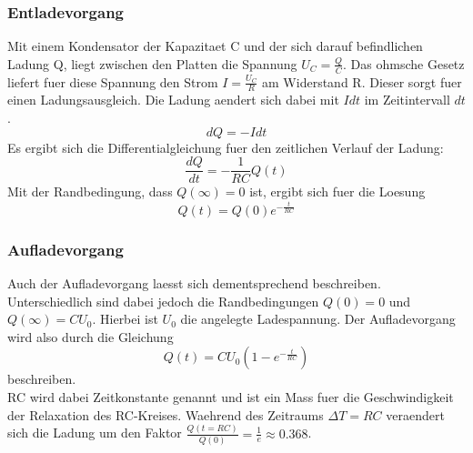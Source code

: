 \subsubsection{Entladevorgang}
Mit einem Kondensator der Kapazitaet C und der sich darauf befindlichen Ladung Q, liegt zwischen den Platten die Spannung $U_C=\frac{Q}{C}$. Das ohmsche Gesetz liefert fuer diese Spannung den Strom $I=\frac{U_C}{R}$ am Widerstand R. Dieser sorgt fuer einen Ladungsausgleich. Die Ladung aendert sich dabei mit $Idt$ im Zeitintervall $dt$. 
\begin{equation}
    dQ=-Idt
\end{equation}
Es ergibt sich die Differentialgleichung fuer den zeitlichen Verlauf der Ladung:
\begin{equation}
    \frac{dQ}{dt}=-\frac{1}{RC}Q(t)
\end{equation}
Mit der Randbedingung, dass $Q(\infty)=0$ ist, ergibt sich fuer die Loesung 
\begin{equation}
    Q(t)=Q(0)e^{-\frac{t}{RC}}
\end{equation}
\subsubsection{Aufladevorgang}
Auch der Aufladevorgang laesst sich dementsprechend beschreiben. Unterschiedlich sind dabei jedoch die Randbedingungen $Q(0)=0$ und $Q(\infty)=CU_0$. Hierbei ist $U_0$ die angelegte Ladespannung. 
Der Aufladevorgang wird also durch die Gleichung 
\begin{equation}
    Q(t)=CU_0(1-e^{-\frac{t}{RC}})
\end{equation}
beschreiben.\\
RC wird dabei Zeitkonstante genannt und ist ein Mass fuer die Geschwindigkeit der Relaxation des RC-Kreises. Waehrend des Zeitraums $\Delta T=RC$ veraendert sich die Ladung um den Faktor $\frac{Q(t=RC)}{Q(0)}=\frac{1}{e}\approx 0.368$.
